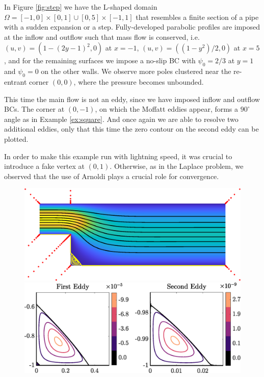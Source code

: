 \begin{example}
\label{ex:step}
In Figure \ref{fig:step} we have the L-shaped domain $\Omega = [-1,0] \times [0,1] \cup [0,5]\times[-1,1]$ that resembles a finite section of a pipe with a sudden expansion or a step. Fully-developed parabolic profiles are imposed at the inflow and outflow such that mass flow is conserved, i.e. $(u,v)=(1-(2y-1)^2,0)$ at $x=-1$, $(u,v)=((1-y^2)/2,0)$ at $x=5$, and for the remaining surfaces we impose a no-slip BC with $\psi_0=2/3$ at $y=1$ and $\psi_0=0$ on the other walls. We observe more poles clustered near the re-entrant corner $(0,0)$, where the pressure becomes unbounded. 

This time the main flow is not an eddy, since we have imposed inflow and outflow BCs. The corner at $(0,-1)$, on which the Moffatt eddies appear, forms a $90^\circ$ angle as in Example \ref{ex:square}. And once again we are able to resolve two additional eddies, only that this time the zero contour on the second eddy can be plotted.

In order to make this example run with lightning speed, it was crucial to introduce a fake vertex at $(0,1)$. Otherwise, as in the Laplace problem, we observed that the use of Arnoldi plays a crucial role for convergence.
\begin{figure}[H]
	\centering
	\includegraphics[width=\linewidth]{Figures/step}
	
	\vspace{2em}
	\includegraphics[width=\linewidth]{Figures/step_eddy}
	

\end{figure}
\end{example}
